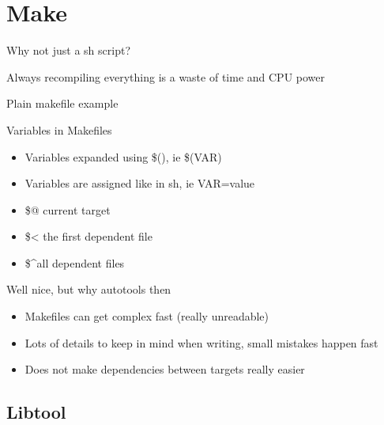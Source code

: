 \documentclass{beamer}
\begin{document}
\section{Make}

\begin{frame}{Why not just a sh script?}
	\begin{center}
    \item Always recompiling everything is a waste of time and CPU power
	\end{center}
\end{frame}

\begin{frame}[t]{Plain makefile example}
	\begin{small}
	
	\end{small}
\end{frame}

\begin{frame}{Variables in Makefiles}
    \begin{itemize}
    \item Variables expanded using \$(), ie \$(VAR)
    \item Variables are assigned like in sh, ie VAR=value
    \item \$@ current target
    \item \$< the first dependent file
    \item \$\textasciicircum all dependent files
    \end{itemize}
\end{frame}

\begin{frame}{Well nice, but why autotools then}
    \begin{itemize}
    \item Makefiles can get complex fast (really unreadable)
    \item Lots of details to keep in mind when writing, small mistakes happen fast
    \item Does not make dependencies between targets really easier
    \end{itemize}
\end{frame}


\subsection{Libtool}
\end{document}
